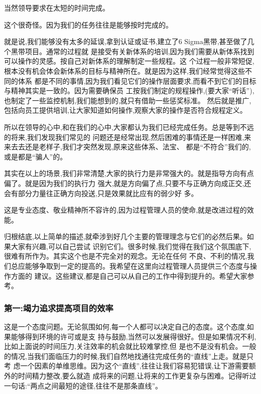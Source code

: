 \documentclass[11pt]{article}
\begin{document}
当然领导要求在太短的时间完成。

这个很奇怪。因为我们的任务往往是能够按时完成的。

就是说,我们能够没有太多的延误,拿到认证或证书,建立了6 Sigma黑带,甚至做了几个黑带项目。通常的过程就
是接受有关新体系的培训,因为我们需要从新体系找到可以操作的灵感。按自己对新体系的理解制定一些规程。这
个过程一般非常短促,根本没有机会体会新体系的目标与精神所在。就是因为这样,我们经常觉得这些不同的体系
都是不同的事情,因为我们看见它们的操作层面要求,而看不到它们的目标与精神其实是一致的。因为需要确保员
工按我们制定的规程操作,(要大家``听话''),也制定了一些监控机制,我们能想到的,就只有借助一些惩奖标准。
然后就是推广,包括向员工提供培训,让大家知道如何操作,观察大家的操作是否符合规程定义。

所以在领导的心中,和在我们的心中,大家都认为我们已经完成任务。总是等到不远的将来,我们发现我们常见的
问题还是经常出现,然后困难的事情还是一样困难,来来去去还是老样子,我们才突然发现,原来这些体系、法宝、
都是``不符合''我们的,或是都是``骗人''的。

其实在以上的场景,我们非常清楚,大家的执行力是非常强大的。就是指导方向有点偏了。就是因为我们的执行力
强大,就是方向偏了点,只要不与正确方向成正交,还会有部分力量往正确方向投送,只是效果就比应有的弱少好
多。

这是专业态度、敬业精神所不容许的,因为过程管理人员的使命,就是改进过程的效能。

归根结底,以上简单的描述,就牵涉到好几个主要的管理理念与它们的必然后果。如果大家有兴趣,可以自己尝试
识别它们。很多时候,我们觉得在我们这个氛围底下,很难有所作为。其实这个也是不完全对的观念。无论在任何
不良、不利的情况,我们总应能够争取到一定的提高的。我希望在这里向过程管理人员提供三个态度与操作方面的
建议。这些建议,都是自己可以从自己的工作中得到提升的。希望大家参考。

\subsubsection{第一:竭力追求提高项目的效率}

这是一个态度问题。无论氛围如何,每一个人都可以决定自己的态度。这个态度,如果能够得到环境的许可或是支
持与鼓励,当然可以发展得很好。但是如果情况不利,比如上面说的时间压力,关注效率的机会就比较难掌控,但
是也不是没有机会。一般的情况,当我们面临压力的时候,我们自然地找通往完成任务的``直线''上走。就是只考
虑一个因素的单维思维。因为这个``直线'',往往让我们容易犯错误,让下游需要额外的时间精力整改,要么就造
成将来的问题,让将来的工作更复杂与困难。记得听过一句话:``两点之间最短的途径,往往不是那条直线''。
\end{document}
